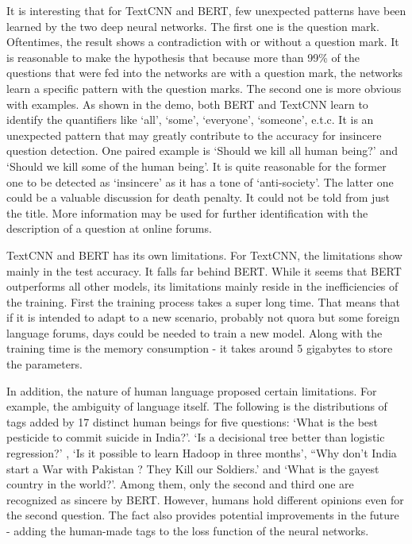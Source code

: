 \documentclass{article}
\begin{document}
It is interesting that for TextCNN and BERT, few unexpected patterns have been learned by the two deep neural networks. The first one is the question mark. Oftentimes, the result shows a contradiction with or without a question mark. It is reasonable to make the hypothesis that because more than 99\% of the questions that were fed into the networks are with a question mark, the networks learn a specific pattern with the question marks. The second one is more obvious with examples. As shown in the demo, both BERT and TextCNN learn to identify the quantifiers like ‘all’, ‘some’, ‘everyone’, ‘someone’, e.t.c. It is an unexpected pattern that may greatly contribute to the accuracy for insincere question detection. One paired example is ‘Should we kill all human being?’ and ‘Should we kill some of the human being’. It is quite reasonable for the former one to be detected as ‘insincere’ as it has a tone of ‘anti-society’. The latter one could be a valuable discussion for death penalty. It could not be told from just the title. More information may be used for further identification with the description of a question at online forums.

TextCNN and BERT has its own limitations. For TextCNN, the limitations show mainly in the test accuracy. It falls far behind BERT. While it seems that BERT outperforms all other models, its limitations mainly reside in the inefficiencies of the training. First the training process takes a super long time. That means that if it is intended to adapt to a new scenario, probably not quora but some foreign language forums, days could be needed to train a new model.  Along with the training time is the memory consumption - it takes around 5 gigabytes to store the parameters.

In addition, the nature of human language proposed certain limitations. For example, the ambiguity of language itself. The following is the distributions of tags added by 17 distinct human beings for five questions: ‘What is the best pesticide to commit suicide in India?’. ‘Is a decisional tree better than logistic regression?’ , ‘Is it possible to learn Hadoop in three months’, “Why don't India start a War with Pakistan ? They Kill our Soldiers.’ and  ‘What is the gayest country in the world?’. Among them, only the second and third one are recognized as sincere by BERT. However, humans hold different opinions even for the second question. The fact also provides potential improvements in the future - adding the human-made tags to the loss function of the neural networks. 
\end{document}
